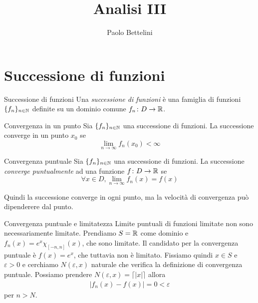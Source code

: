 \documentclass[a4paper]{article}
\title{Analisi III}
\author{Paolo Bettelini}
\date{}
\begin{document}
\maketitle
\tableofcontents

\pagebreak

\section{Successione di funzioni}

\begin{radioactive}
\begin{snippetdefinition}{Successione di funzioni}
    Una \emph{successione di funzioni} è una famiglia di funzioni \(\{f_n\}_{n\in\mathbb{N}}\)
    definite su un dominio comune \(f_n \colon D \to \mathbb{R}\).
\end{snippetdefinition}
\end{radioactive}

\begin{radioactive}
\begin{snippetdefinition}{Convergenza in un punto}
    Sia \(\{f_n\}_{n\in\mathbb{N}}\) una successione di funzioni.
    La successione converge in un punto \(x_0\) se
    \[
        \lim_{n\to\infty} f_n(x_0) < \infty
    \]
\end{snippetdefinition}
\end{radioactive}

\begin{radioactive}
\begin{snippetdefinition}{Convergenza puntuale}
    Sia \(\{f_n\}_{n\in\mathbb{N}}\) una successione di funzioni.
    La successione \emph{converge puntualmente} ad una funzione \(f\colon D \to \mathbb{R}\) se
    \[
        \forall x\in D, \lim_{n\to\infty} f_n(x) = f(x)
    \]
\end{snippetdefinition}
\end{radioactive}

\begin{radioactive}
Quindi la successione converge in ogni punto, ma la velocità di convergenza può dipenderere dal punto.
\end{radioactive}

\begin{radioactive}
\begin{snippetexample}{Convergenza puntuale e limitatezza}
    Limite puntuali di funzioni limitate non sono necessariamente limitate.
    Prendiamo \(S = \mathbb{R}\) come dominio e \(f_n(x) = e^x \chi_{[-n, n]}(x)\), che sono limitate.
    Il candidato per la convergenza puntuale è \(f(x) = e^x\), che tuttavia non è limitato.
    Fissiamo quindi \(x \in S\) e \(\varepsilon > 0\) e cerchiamo
    \(N(\varepsilon, x)\) naturale che verifica la definizione di convergenza puntuale.
    Possiamo prendere \(N(\varepsilon, x) = \lceil |x| \rceil\) allora
    \begin{align*}
        |f_n(x) - f(x)| = 0 < \varepsilon
    \end{align*}
    per \(n > N\).
\end{snippetexample}
\end{radioactive}
\end{document}
